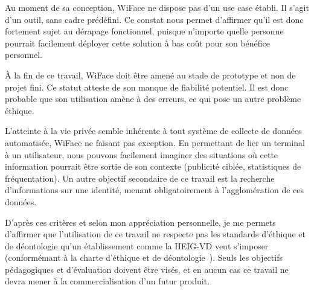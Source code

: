Au moment de sa conception, WiFace ne dispose pas d’un use case établi. Il s’agit d’un outil, sans cadre prédéfini.
Ce constat nous permet d’affirmer qu’il est donc fortement sujet au dérapage fonctionnel, puisque n’importe quelle
personne pourrait facilement déployer cette solution à bas coût pour son bénéfice personnel.

À la fin de ce travail, WiFace doit être amené au stade de prototype et non de projet fini. Ce statut atteste de son
manque de fiabilité potentiel. Il est donc probable que son utilisation amène à des erreurs, ce qui pose un autre
problème éthique.

L’atteinte à la vie privée semble inhérente à tout système de collecte de données automatisée, WiFace ne faisant
pas exception. En permettant de lier un terminal à un utilisateur, nous pouvons facilement imaginer des situations
où cette information pourrait être sortie de son contexte (publicité ciblée, statistiques de fréquentation). Un autre
objectif secondaire de ce travail est la recherche d’informations sur une identité, menant obligatoirement à
l’agglomération de ces données.

D’après ces critères et selon mon appréciation personnelle, je me permets d'affirmer que l’utilisation de ce travail ne respecte pas les standards d’éthique et de déontologie
qu’un établissement comme la HEIG-VD veut s’imposer (conformémant à la charte d'éthique et de déontologie~\cite{HESCHARTE}). Seuls les objectifs pédagogiques et d’évaluation doivent
être visés, et en aucun cas ce travail ne devra mener à la commercialisation d’un futur produit.

